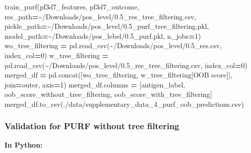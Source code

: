 \documentclass[
  11pt,
  oneside]{book}
\newenvironment{Shaded}{\begin{snugshade}}{\end{snugshade}}
\newcommand{\DecValTok}[1]{\textcolor[rgb]{0.00,0.00,0.81}{#1}}
\newcommand{\NormalTok}[1]{#1}
\newcommand{\OperatorTok}[1]{\textcolor[rgb]{0.81,0.36,0.00}{\textbf{#1}}}
\newcommand{\StringTok}[1]{\textcolor[rgb]{0.31,0.60,0.02}{#1}}
\begin{document}
\begin{Shaded}
\begin{Highlighting}[]
\NormalTok{train\_purf(pf3d7\_features, pf3d7\_outcome,}
\NormalTok{           res\_path}\OperatorTok{=}\StringTok{\textquotesingle{}\textasciitilde{}/Downloads/pos\_level/0.5\_res\_tree\_filtering.csv\textquotesingle{}}\NormalTok{,}
\NormalTok{           pickle\_path}\OperatorTok{=}\StringTok{\textquotesingle{}\textasciitilde{}/Downloads/pos\_level/0.5\_purf\_tree\_filtering.pkl\textquotesingle{}}\NormalTok{,}
\NormalTok{           model\_path}\OperatorTok{=}\StringTok{\textquotesingle{}\textasciitilde{}/Downloads/pos\_lebel/0.5\_purf.pkl\textquotesingle{}}\NormalTok{,}
\NormalTok{           n\_jobs}\OperatorTok{=}\DecValTok{1}\NormalTok{)}
\NormalTok{wo\_tree\_filtering }\OperatorTok{=}\NormalTok{ pd.read\_csv(}\StringTok{\textquotesingle{}\textasciitilde{}/Downloads/pos\_level/0.5\_res.csv\textquotesingle{}}\NormalTok{, index\_col}\OperatorTok{=}\DecValTok{0}\NormalTok{)}
\NormalTok{w\_tree\_filtering }\OperatorTok{=}\NormalTok{ pd.read\_csv(}\StringTok{\textquotesingle{}\textasciitilde{}/Downloads/pos\_level/0.5\_res\_tree\_filtering.csv\textquotesingle{}}\NormalTok{, index\_col}\OperatorTok{=}\DecValTok{0}\NormalTok{)}
\NormalTok{merged\_df }\OperatorTok{=}\NormalTok{ pd.concat([wo\_tree\_filtering, w\_tree\_filtering[}\StringTok{\textquotesingle{}OOB score\textquotesingle{}}\NormalTok{]], join}\OperatorTok{=}\StringTok{\textquotesingle{}outer\textquotesingle{}}\NormalTok{, axis}\OperatorTok{=}\DecValTok{1}\NormalTok{)}
\NormalTok{merged\_df.columns }\OperatorTok{=}\NormalTok{ [}\StringTok{\textquotesingle{}antigen\_label\textquotesingle{}}\NormalTok{, }\StringTok{\textquotesingle{}oob\_score\_without\_tree\_filtering\textquotesingle{}}\NormalTok{, }\StringTok{\textquotesingle{}oob\_score\_with\_tree\_filtering\textquotesingle{}}\NormalTok{]}
\NormalTok{merged\_df.to\_csv(}\StringTok{\textquotesingle{}./data/supplementary\_data\_4\_purf\_oob\_predictions.csv\textquotesingle{}}\NormalTok{)}
\end{Highlighting}
\end{Shaded}

\hypertarget{validation-for-purf-without-tree-filtering}{%
\subsubsection{Validation for PURF without tree filtering}\label{validation-for-purf-without-tree-filtering}}

\textbf{In Python: }
\end{document}
